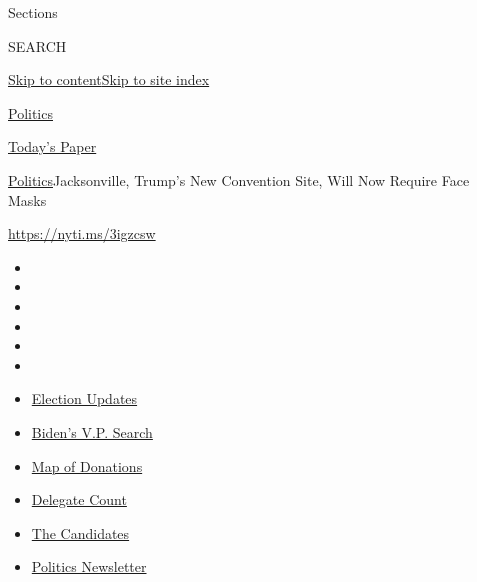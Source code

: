 Sections

SEARCH

\protect\hyperlink{site-content}{Skip to
content}\protect\hyperlink{site-index}{Skip to site index}

\href{https://www.nytimes.com/section/politics}{Politics}

\href{https://myaccount.nytimes.com/auth/login?response_type=cookie\&client_id=vi}{}

\href{https://www.nytimes.com/section/todayspaper}{Today's Paper}

\href{/section/politics}{Politics}\textbar{}Jacksonville, Trump's New
Convention Site, Will Now Require Face Masks

\url{https://nyti.ms/3igzcsw}

\begin{itemize}
\item
\item
\item
\item
\item
\item
\end{itemize}

\begin{itemize}
\item
  \href{https://www.nytimes.com/2020/07/31/us/elections/biden-vs-trump.html?action=click\&pgtype=Article\&state=default\&region=TOP_BANNER\&context=storylines_menu}{Election
  Updates}
\item
  \href{https://www.nytimes.com/article/biden-vice-president-2020.html?action=click\&pgtype=Article\&state=default\&region=TOP_BANNER\&context=storylines_menu}{Biden's
  V.P. Search}
\item
  \href{https://www.nytimes.com/interactive/2020/07/24/us/politics/trump-biden-campaign-donors.html?action=click\&pgtype=Article\&state=default\&region=TOP_BANNER\&context=storylines_menu}{Map
  of Donations}
\item
  \href{https://www.nytimes.com/interactive/2020/us/elections/delegate-count-primary-results.html?action=click\&pgtype=Article\&state=default\&region=TOP_BANNER\&context=storylines_menu}{Delegate
  Count}
\item
  \href{https://www.nytimes.com/interactive/2019/us/politics/2020-presidential-candidates.html?action=click\&pgtype=Article\&state=default\&region=TOP_BANNER\&context=storylines_menu}{The
  Candidates}
\item
  \href{https://www.nytimes.com/newsletters/politics?action=click\&pgtype=Article\&state=default\&region=TOP_BANNER\&context=storylines_menu}{Politics
  Newsletter}
\end{itemize}

